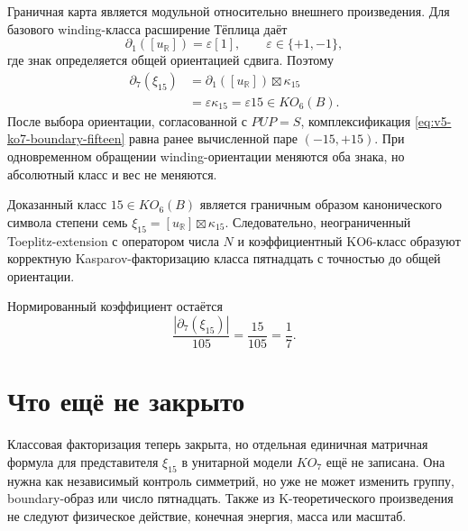 Граничная карта является модульной относительно внешнего произведения.
Для базового winding-класса расширение Тёплица даёт
\begin{equation}
 \partial_1([u_{\mathbb R}])=\varepsilon[1],
 \qquad \varepsilon\in\{+1,-1\},
 \label{eq:v5-ko7-base-index}
\end{equation}
где знак определяется общей ориентацией сдвига. Поэтому
\begin{align}
 \partial_7(\xi_{15})
 &=\partial_1([u_{\mathbb R}])\boxtimes\kappa_{15}\\
 &=\varepsilon\kappa_{15}
 =\varepsilon15\in KO_6(B).
 \label{eq:v5-ko7-boundary-fifteen}
\end{align}
После выбора ориентации, согласованной с $PUP=S$, комплексификация
\eqref{eq:v5-ko7-boundary-fifteen} равна ранее вычисленной паре
$(-15,+15)$. При одновременном обращении winding-ориентации меняются оба
знака, но абсолютный класс и вес не меняются.

\begin{theorem}
Доказанный класс $15\in KO_6(B)$ является граничным образом
канонического символа степени семь
$\xi_{15}=[u_{\mathbb R}]\boxtimes\kappa_{15}$.
Следовательно, неограниченный Toeplitz-extension с оператором числа $N$
и коэффициентный KO6-класс образуют корректную Kasparov-факторизацию
класса пятнадцать с точностью до общей ориентации.
\end{theorem}

Нормированный коэффициент остаётся
\begin{equation}
 \frac{|\partial_7(\xi_{15})|}{105}=\frac{15}{105}=\frac17.
\end{equation}

\section{Что ещё не закрыто}

Классовая факторизация теперь закрыта, но отдельная единичная матричная
формула для представителя $\xi_{15}$ в унитарной модели $KO_7$ ещё не
записана. Она нужна как независимый контроль симметрий, но уже не может
изменить группу, boundary-образ или число пятнадцать. Также из
K-теоретического произведения не следуют физическое действие, конечная
энергия, масса или масштаб.

